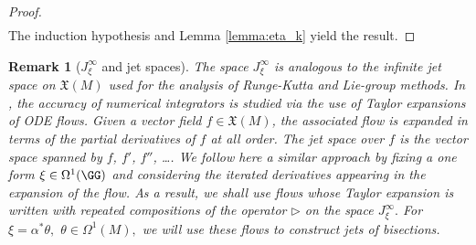 \documentclass[a4paper,11pt]{article}
\newtheorem{remark}[theorem]{Remark}
\begin{document}
\begin{proof}
\begin{align*}
\end{align*}
The induction hypothesis and Lemma \ref{lemma:eta_k} yield the result.
\end{proof}



\begin{remark}[$J_\xi^\infty$ and jet spaces]
\label{rem:relation_Rn}
The space $J_\xi^\infty$ is analogous to the infinite jet space \cite{Anderson89tvb, Olver93aol, Lee13its} on $\mathfrak{X}(M)$ used for the analysis of Runge-Kutta and Lie-group methods.
In \cite{Iserles00lgm, Hairer06gni}, the accuracy of numerical integrators is studied via the use of Taylor expansions of ODE flows. Given a vector field $f\in \mathfrak{X}(M)$, the associated flow is expanded in terms of the partial derivatives of $f$ at all order. The jet space over $f$ is the vector space spanned by $f$, $f'$, $f''$, \dots.
We follow here a similar approach by fixing a one form $\xi \in \Omega^1(\GG)$ and considering the iterated derivatives appearing in the expansion of the flow. As a result, we shall use flows whose Taylor expansion is written with repeated compositions of the operator $\triangleright$ on the space $J_\xi^\infty.$
For $\xi = \alpha^* \theta,$ $\theta \in \Omega^1(M),$ we will use these flows to construct jets of bisections.
\end{remark}
\end{document}
